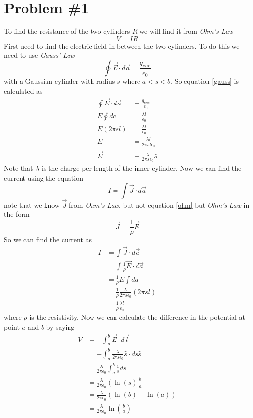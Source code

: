 \documentclass[11pt]{article}
\numberwithin{equation}{section}
\newcommand{\vecE}{\vec{E}}
\begin{document}


\section{Problem \#1}
To find the resistance of the two cylinders $R$ we will find it from \emph{Ohm's Law}
\begin{equation}
V = IR
\label{ohm}
\end{equation}
First need to find the electric field in between the two cylinders. To do this we need to use \emph{Gauss' Law}
\begin{equation}
\oint\vecE\cdot d\vec{a} = \frac{q_{enc}}{\epsilon_0}
\label{gauss}
\end{equation}
with a Gaussian cylinder with radius $s$ where $a<s<b$. So equation \ref{gauss} is calculated as
\begin{align*}
\oint\vecE\cdot d\vec{a} &= \frac{q_{enc}}{\epsilon_0}\\
E\oint da &= \frac{\lambda l}{\epsilon_0}\\
E(2\pi sl) &= \frac{\lambda l}{\epsilon_0}\\
E &= \frac{\lambda l}{2\pi sl\epsilon_0}\\
\vecE &= \frac{\lambda}{2\pi s\epsilon_0}\hat{s}
\end{align*}
Note that $\lambda$ is the charge per length of the inner cylinder. Now we can find the current using the equation
$$I = \int \vec{J}\cdot d\vec{a}$$
note that we know $\vec{J}$ from \emph{Ohm's Law}, but not equation \ref{ohm} but \emph{Ohm's Law} in the form
\begin{equation}
\vec{J} = \frac{1}{\rho}\vec{E}
\label{ohm2}
\end{equation}
So we can find the current as
\begin{align*}
I &= \int \vec{J}\cdot d\vec{a}\\
&= \int \frac{1}{\rho}\vec{E}\cdot d\vec{a}\\
&= \frac{1}{\rho}E\int da\\
&= \frac{1}{\rho}\frac{\lambda}{2\pi s\epsilon_0}(2\pi sl)\\
&= \frac{1}{\rho}\frac{\lambda l}{\epsilon_0}
\end{align*}
where $\rho$ is the resistivity. Now we can calculate the difference in the potential at point $a$ and $b$ by saying 
\begin{align*}
V &= -\int_a^b\vecE\cdot d\vec{l}\\
&= -\int_a^b\frac{\lambda}{2\pi s\epsilon_0}\hat{s}\cdot ds\hat{s}\\
&= \frac{\lambda}{2\pi\epsilon_0}\int_a^b\frac{1}{s} ds\\
&= \frac{\lambda}{2\pi\epsilon_0}\left(\ln(s)\right|_a^b\\
&= \frac{\lambda}{2\pi\epsilon_0}\left(\ln(b)-\ln(a)\right)\\
&= \frac{\lambda}{2\pi\epsilon_0}\ln\left(\frac{b}{a}\right)
\end{align*}
\end{document}
